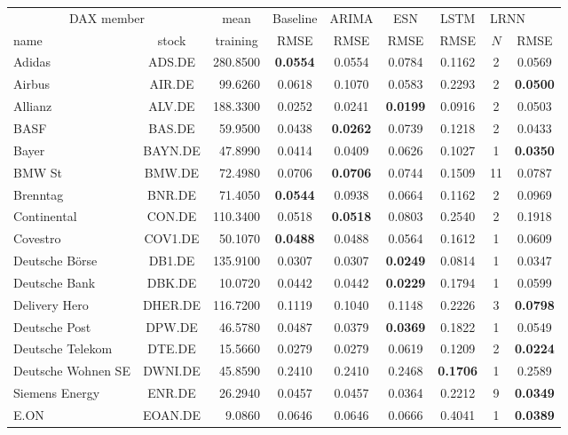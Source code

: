 \documentclass[twoside,11pt]{article}
\theoremstyle{definition}
\newcommand{\head}[1]{\multicolumn{1}{c}{#1}}
\begin{document}
\begin{table}
\small
\begin{tabular}{l@{ }crcccccc}
\toprule
\multicolumn{2}{c}{DAX member} & \head{mean} & Baseline & ARIMA & ESN & LSTM & \multicolumn{2}{l}{LRNN}\\
name & stock & \head{training} & RMSE & RMSE & RMSE & RMSE & $N$ & RMSE\\ \midrule
Adidas & ADS.DE & 280.8500 & \textbf{0.0554} & 0.0554 & 0.0784 & 0.1162 & 2 & 0.0569\\
Airbus & AIR.DE & 99.6260 & 0.0618 & 0.1070 & 0.0583 & 0.2293 & 2 & \textbf{0.0500}\\
Allianz & ALV.DE & 188.3300 & 0.0252 & 0.0241 & \textbf{0.0199} & 0.0916 & 2 & 0.0503\\
BASF & BAS.DE & 59.9500 & 0.0438 & \textbf{0.0262} & 0.0739 & 0.1218 & 2 & 0.0433\\
Bayer & BAYN.DE & 47.8990 & 0.0414 & 0.0409 & 0.0626 & 0.1027 & 1 & \textbf{0.0350}\\
BMW St & BMW.DE & 72.4980 & 0.0706 & \textbf{0.0706} & 0.0744 & 0.1509 & 11 & 0.0787\\
Brenntag & BNR.DE & 71.4050 & \textbf{0.0544} & 0.0938 & 0.0664 & 0.1162 & 2 & 0.0969\\
Continental & CON.DE & 110.3400 & 0.0518 & \textbf{0.0518} & 0.0803 & 0.2540 & 2 & 0.1918\\
Covestro & COV1.DE & 50.1070 & \textbf{0.0488} & 0.0488 & 0.0564 & 0.1612 & 1 & 0.0609\\
Deutsche Börse & DB1.DE & 135.9100 & 0.0307 & 0.0307 & \textbf{0.0249} & 0.0814 & 1 & 0.0347\\
Deutsche Bank & DBK.DE & 10.0720 & 0.0442 & 0.0442 & \textbf{0.0229} & 0.1794 & 1 & 0.0599\\
Delivery Hero & DHER.DE & 116.7200 & 0.1119 & 0.1040 & 0.1148 & 0.2226 & 3 & \textbf{0.0798}\\
Deutsche Post & DPW.DE & 46.5780 & 0.0487 & 0.0379 & \textbf{0.0369} & 0.1822 & 1 & 0.0549\\
Deutsche Telekom & DTE.DE & 15.5660 & 0.0279 & 0.0279 & 0.0619 & 0.1209 & 2 & \textbf{0.0224}\\
Deutsche Wohnen SE & DWNI.DE & 45.8590 & 0.2410 & 0.2410 & 0.2468 & \textbf{0.1706} & 1 & 0.2589\\
Siemens Energy & ENR.DE & 26.2940 & 0.0457 & 0.0457 & 0.0364 & 0.2212 & 9 & \textbf{0.0349}\\
E.ON & EOAN.DE & 9.0860 & 0.0646 & 0.0646 & 0.0666 & 0.4041 & 1 & \textbf{0.0389}\\

\end{tabular}
\end{table}
\end{document}
